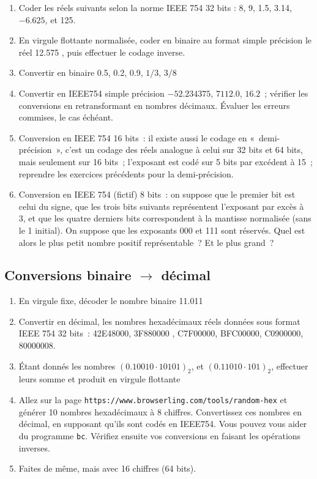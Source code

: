\documentclass[a4paper,12pt]{article}
\begin{document}
\begin{enumerate}
\item Coder les réels suivants selon la norme IEEE 754 32 bits : 8, 9, 1.5, 3.14, $-6.625$, et 125.
\item En virgule flottante normalisée, coder en binaire au format simple précision le réel 12.575 , puis
  effectuer le codage inverse.
\item Convertir en binaire 0.5, 0.2, 0.9, $1/3$, $3/8$
\item Convertir en IEEE754 simple précision
  $-52.234375$, $7112.0$, $16.2$~;
  vérifier les conversions en retransformant en nombres décimaux.
  Évaluer les erreurs commises, le cas échéant.

\item Conversion en IEEE 754 16 bits~: il existe aussi le codage
  en «~demi-précision~», c'est un codage des réels analogue
  à celui sur 32 bits et 64 bits, mais seulement sur 16 bits~;
  l'exposant est codé sur 5 bits par excédent à 15~;
  reprendre les exercices précédents pour la demi-précision.

\item Conversion en IEEE 754 (fictif) 8 bits~: on suppose que le premier
  bit est celui du signe, que les trois bits suivants représentent l'exposant
  par excès à 3, et que les quatre derniers bits correspondent à la
  mantisse normalisée (sans le 1 initial).
  On suppose que les exposants 000 et 111 sont réservés.
  Quel est alors le plus petit nombre positif représentable~? Et le plus grand~?

  
 
  
\end{enumerate}

\subsection{Conversions binaire $\rightarrow$ décimal}

\begin{enumerate}
\item En virgule fixe, décoder le nombre binaire 11.011

\item Convertir en décimal, les nombres hexadécimaux réels données
  sous format IEEE 754 32 bits~:
42E48000, 3F880000 , C7F00000, BFC00000, C0900000, 80000008.

\item Étant donnés les nombres $( 0.10010\cdot 10101 )_2$,
et $( 0.11010 \cdot 101 )_2$, effectuer leurs somme et
produit en virgule flottante

\item Allez sur la page \verb|https://www.browserling.com/tools/random-hex|
  et générer 10 nombres hexadécimaux à 8 chiffres. Convertissez ces
  nombres en décimal, en supposant qu'ils sont codés en IEEE754.
  Vous pouvez vous aider du programme \texttt{bc}.
  Vérifiez ensuite vos conversions en faisant les
  opérations inverses.

\item Faites de même, mais avec 16 chiffres (64 bits).
\end{enumerate}
\end{document}
